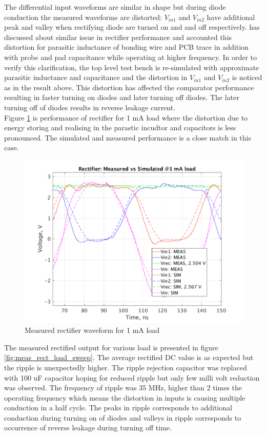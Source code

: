 \documentclass[12pt,a4paper,UKenglish]{report}
\begin{document}
 The differential input waveforms are similar in shape 
 but during diode conduction the measured waveforms are distorted: $V_{in1}$ and $V_{in2}$ have additional peak and valley 
 when rectifying diode are turned on and and off respectively.  \cite{parasitic_effect} has discussed about similar issue in rectifier 
 performance and accounted this distortion for parasitic inductance of bonding wire and PCB trace in addition with probe and 
 pad capacitance while operating at higher frequency. In order to verify this clarification, the top level test bench is re-simulated with approximate parasitic 
 inductance and capacitance and the distortion in $V_{in1}$ and $V_{in2}$ is noticed as in the result above. This distortion 
 has affected the comparator performance resulting in faster turning on diodes and later turning off diodes. The later turning 
 off of diodes results in reverse leakage current. \\

Figure \ref{fig:meas_rect_1ma} is performance of rectifier for 1 mA load where the distortion due to energy storing and 
realising in the parastic incudtor and capacitors is less pronounced. The simulated and measured performance is a close match 
in this case. \\

\begin{figure} [H]
  \centering
  \includegraphics[width=\textwidth]{img/meas/rect_1ma.pdf} 
 \caption{Measured rectifier waveform for 1 mA load} 
\label{fig:meas_rect_1ma} 
\end{figure}

The measured rectified output for various load is presented in figure \ref{fig:meas_rect_load_sweep}. The average rectified 
DC value is as expected but the ripple is unexpectedly higher. The ripple rejection capacitor was replaced with 100 uF capacitor 
hoping for reduced ripple but only few milli volt reduction was observed.
The frequency of ripple was 35 MHz, higher than 2 times the operating frequency which means the distortion in inputs is causing 
multiple conduction in a half cycle. The peaks in ripple corresponds to additional conduction during turning on of diodes and 
valleys in ripple corresponds to occurrence of reverse leakage during turning off time. \\
\end{document}
